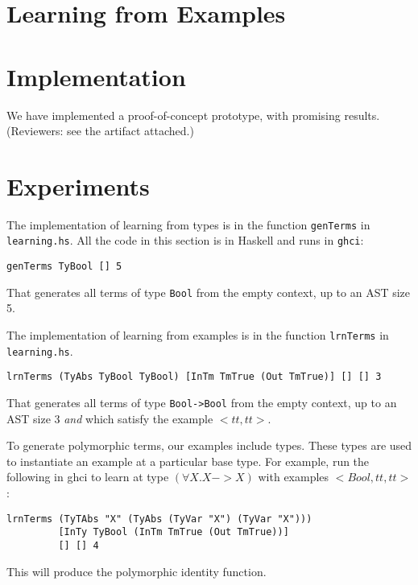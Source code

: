 \documentclass[acmsmall]{acmart}
\theoremstyle{mytheoremstyle}
\begin{document}
\section{Learning from Examples}

\section{Implementation}

We have implemented a proof-of-concept prototype, with promising results.
(Reviewers: see the artifact attached.)


\section{Experiments}

The implementation of learning from types is in the function {\tt genTerms} in {\tt learning.hs}. All the code in this section is in Haskell and runs in {\tt ghci}:
\begin{verbatim}
genTerms TyBool [] 5
\end{verbatim}

That generates all terms of type {\tt Bool} from the empty context, up to an AST size 5.

The implementation of learning from examples is in the function {\tt lrnTerms} in {\tt learning.hs}.
\begin{verbatim}
lrnTerms (TyAbs TyBool TyBool) [InTm TmTrue (Out TmTrue)] [] [] 3
\end{verbatim}

That generates all terms of type {\tt Bool->Bool} from the empty context, up to an AST size 3 \emph{and} which satisfy the example $<tt,tt>$. 

To generate polymorphic terms, our examples include types. These types are used to instantiate an example at a particular base type. For example, run the following in ghci to learn at type $(\forall X.X->X)$ with examples $<Bool,tt,tt>$:
\begin{verbatim}
lrnTerms (TyTAbs "X" (TyAbs (TyVar "X") (TyVar "X")))
         [InTy TyBool (InTm TmTrue (Out TmTrue))]
         [] [] 4
\end{verbatim}
This will produce the polymorphic identity function.
\end{document}
